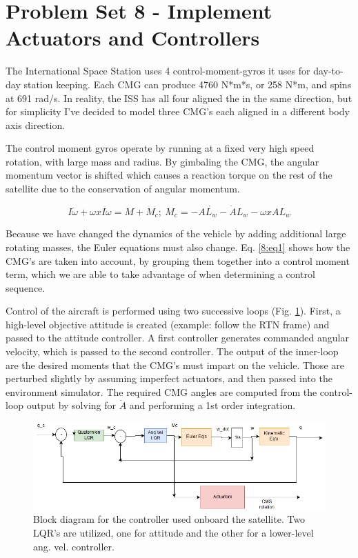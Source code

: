 \documentclass[12pt, letterpaper]{article}
\begin{document}
\section{Problem Set 8 - Implement Actuators and Controllers}

The International Space Station uses 4 control-moment-gyros it uses for day-to-day station keeping. Each CMG can produce 4760 N*m*s, or 258 N*m, and spins at 691 rad/s. In reality, the ISS has all four aligned the in the same direction, but for simplicity I've decided to model three CMG's each aligned in a different body axis direction.

The control moment gyros operate by running at a fixed very high speed rotation, with large mass and radius. By gimbaling the CMG, the angular momentum vector is shifted which causes a reaction torque on the rest of the satellite due to the conservation of angular momentum.


\begin{equation}
I\dot{\omega} + \omega x I\omega = M + M_c;\ M_c = -A\dot{L_w}-\dot{A}L_w-\omega x AL_w
\label{8:eq1}
\end{equation}

Because we have changed the dynamics of the vehicle by adding additional large rotating masses, the Euler equations must also change. Eq. \ref{8:eq1} shows how the CMG's are taken into account, by grouping them together into a control moment term, which we are able to take advantage of when determining a control sequence. 

Control of the aircraft is performed using two successive loops (Fig. \ref{8:controller}). First, a high-level objective attitude is created (example: follow the RTN frame) and passed to the attitude controller. A first controller generates commanded angular velocity, which is passed to the second controller. The output of the inner-loop are the desired moments that the CMG's must impart on the vehicle. Those are perturbed slightly by assuming imperfect actuators, and then passed into the environment simulator. The required CMG angles are computed from the control-loop output by solving for $\dot{A}$ and performing a 1st order integration.


\begin{figure}[H]
	\centering
	\includegraphics[scale=0.7]{PS8_controller}
	\caption{Block diagram for the controller used onboard the satellite. Two LQR's are utilized, one for attitude and the other for a lower-level ang. vel. controller.}
	\label{8:controller}
\end{figure}
\end{document}
